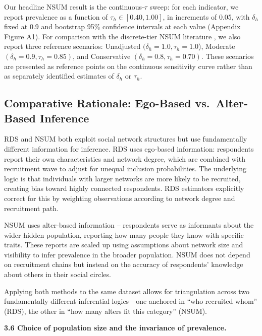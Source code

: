 \documentclass[
  12pt,
  letterpaper,
  DIV=11,
  numbers=noendperiod]{scrartcl}
\begin{document}
Our headline NSUM result is the continuous-\(\tau\) sweep: for each
indicator, we report prevalence as a function of
\(\tau_h \in [0.40, 1.00]\), in increments of 0.05, with \(\delta_h\)
fixed at 0.9 and bootstrap 95\% confidence intervals at each value
(Appendix Figure A1). For comparison with the discrete-tier NSUM
literature
\autocite{kill98-social,malt15-estimating,feeh16-generalizing}, we also
report three reference scenarios: Unadjusted
\((\delta_h = 1.0, \tau_h = 1.0\)), Moderate
\((\delta_h = 0.9, \tau_h = 0.85)\), and Conservative
\((\delta_h = 0.8, \tau_h = 0.70)\). These scenarios are presented as
reference points on the continuous sensitivity curve rather than as
separately identified estimates of \(\delta_h\) or \(\tau_h\).

\subsection{Comparative Rationale: Ego-Based vs.~Alter-Based
Inference}\label{sec-comparative-rationale}

RDS and NSUM both exploit social network structures but use
fundamentally different information for inference. RDS uses ego-based
information: respondents report their own characteristics and network
degree, which are combined with recruitment wave to adjust for unequal
inclusion probabilities. The underlying logic is that individuals with
larger networks are more likely to be recruited, creating bias toward
highly connected respondents. RDS estimators explicitly correct for this
by weighting observations according to network degree and recruitment
path.

NSUM uses alter-based information -- respondents serve as informants
about the wider hidden population, reporting how many people they know
with specific traits. These reports are scaled up using assumptions
about network size and visibility to infer prevalence in the broader
population. NSUM does not depend on recruitment chains but instead on
the accuracy of respondents' knowledge about others in their social
circles.

Applying both methods to the same dataset allows for triangulation
across two fundamentally different inferential logics---one anchored in
``who recruited whom'' (RDS), the other in ``how many alters fit this
category'' (NSUM).

\textbf{3.6 Choice of population size and the invariance of prevalence.}
\end{document}
